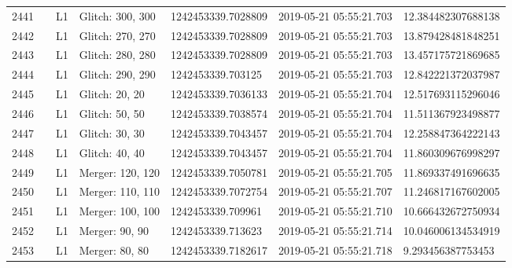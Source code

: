 \begin{longtable}{lllllll}
2441 &                                                    &       L1 &  Glitch: 300, 300 &  1242453339.7028809 &  2019-05-21 05:55:21.703 &  12.384482307688138 \\
2442 &                                                    &       L1 &  Glitch: 270, 270 &  1242453339.7028809 &  2019-05-21 05:55:21.703 &  13.879428481848251 \\
2443 &                                                    &       L1 &  Glitch: 280, 280 &  1242453339.7028809 &  2019-05-21 05:55:21.703 &  13.457175721869685 \\
2444 &                                                    &       L1 &  Glitch: 290, 290 &   1242453339.703125 &  2019-05-21 05:55:21.703 &  12.842221372037987 \\
2445 &                                                    &       L1 &    Glitch: 20, 20 &  1242453339.7036133 &  2019-05-21 05:55:21.704 &  12.517693115296046 \\
2446 &                                                    &       L1 &    Glitch: 50, 50 &  1242453339.7038574 &  2019-05-21 05:55:21.704 &  11.511367923498877 \\
2447 &                                                    &       L1 &    Glitch: 30, 30 &  1242453339.7043457 &  2019-05-21 05:55:21.704 &  12.258847364222143 \\
2448 &                                                    &       L1 &    Glitch: 40, 40 &  1242453339.7043457 &  2019-05-21 05:55:21.704 &  11.860309676998297 \\
2449 &                                                    &       L1 &  Merger: 120, 120 &  1242453339.7050781 &  2019-05-21 05:55:21.705 &  11.869337491696635 \\
2450 &                                                    &       L1 &  Merger: 110, 110 &  1242453339.7072754 &  2019-05-21 05:55:21.707 &  11.246817167602005 \\
2451 &                                                    &       L1 &  Merger: 100, 100 &   1242453339.709961 &  2019-05-21 05:55:21.710 &  10.666432672750934 \\
2452 &                                                    &       L1 &    Merger: 90, 90 &   1242453339.713623 &  2019-05-21 05:55:21.714 &  10.046006134534919 \\
2453 &                                                    &       L1 &    Merger: 80, 80 &  1242453339.7182617 &  2019-05-21 05:55:21.718 &   9.293456387753453 \\

\end{longtable}
